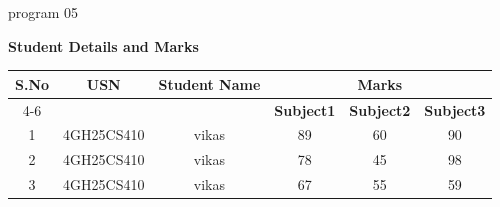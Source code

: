 program 05 \documentclass{article}
\begin{document}
	\centering
	\textbf{\Large{Student Details and Marks}} %
	\vspace{0.1in}
	
	\begin{table}[h]
		\centering
		\begin{tabular}{|c|c|c|c|c|c|} %
			\hline
			\multirow{2}{*}{\textbf{S.No}} & \multirow{2}{*}{\textbf{USN}} & \multirow{2}{*}{\textbf{Student Name}} & \multicolumn{3}{c|}{\textbf{Marks}} \\ %
			\cline{4-6} %
			& & & \textbf{Subject1} & \textbf{Subject2} & \textbf{Subject3} \\ %
			\hline
			\multicolumn{1}{|c|}{1} & \multicolumn{1}{c|}{4GH25CS410} & \multicolumn{1}{c|}{vikas} & 89 & 60 & 90 \\ %
			\hline
			\multicolumn{1}{|c|}{2} & \multicolumn{1}{c|}{4GH25CS410} & \multicolumn{1}{c|}{vikas} & 78 & 45 & 98 \\
			\hline
			\multicolumn{1}{|c|}{3} & \multicolumn{1}{c|}{4GH25CS410} & \multicolumn{1}{c|}{vikas} & 67 & 55 & 59 \\
			\hline
		\end{tabular}
	\end{table}
	
\end{document}
